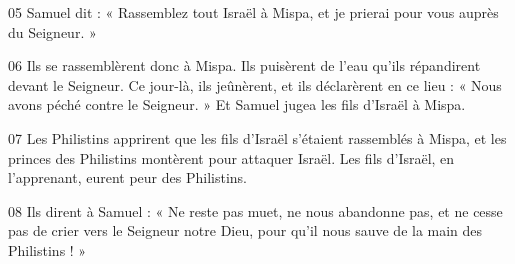 
05 Samuel dit : « Rassemblez tout Israël à Mispa, et je prierai pour vous auprès du Seigneur. »

06 Ils se rassemblèrent donc à Mispa. Ils puisèrent de l’eau qu’ils répandirent devant le Seigneur. Ce jour-là, ils jeûnèrent, et ils déclarèrent en ce lieu : « Nous avons péché contre le Seigneur. » Et Samuel jugea les fils d’Israël à Mispa.

07 Les Philistins apprirent que les fils d’Israël s’étaient rassemblés à Mispa, et les princes des Philistins montèrent pour attaquer Israël. Les fils d’Israël, en l’apprenant, eurent peur des Philistins.

08 Ils dirent à Samuel : « Ne reste pas muet, ne nous abandonne pas, et ne cesse pas de crier vers le Seigneur notre Dieu, pour qu’il nous sauve de la main des Philistins ! »